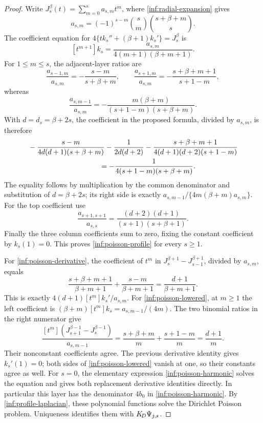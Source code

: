 \begin{proof}
Write $J_s^\beta(t)=\sum_{m=0}^s a_{s,m}t^m$, where
\eqref{inf:radial-expansion} gives
\[
 a_{s,m}=(-1)^{s-m}\binom sm\binom{s+\beta+m}s.
\]
The coefficient equation for
$4\{tk_s''+(\beta+1)k_s'\}=J_s^\beta$ is
\[
 [t^{m+1}]k_s=\frac{a_{s,m}}{4(m+1)(\beta+m+1)}.
\]
For $1\le m\le s$, the adjacent-layer ratios are
\[
 \frac{a_{s-1,m}}{a_{s,m}}=-\frac{s-m}{s+\beta+m},\qquad
 \frac{a_{s+1,m}}{a_{s,m}}=-\frac{s+\beta+m+1}{s+1-m},
\]
whereas
\[
 \frac{a_{s,m-1}}{a_{s,m}}
 =-\frac{m(\beta+m)}{(s+1-m)(s+\beta+m)}.
\]
With $d=d_s=\beta+2s$, the coefficient in the proposed formula,
divided by $a_{s,m}$, is therefore
\begin{align*}
 &-\frac{s-m}{4d(d+1)(s+\beta+m)}-\frac1{2d(d+2)}
 -\frac{s+\beta+m+1}{4(d+1)(d+2)(s+1-m)}\\
 &\hspace{35mm}=-\frac1{4(s+1-m)(s+\beta+m)}.
\end{align*}
The equality follows by multiplication by the common denominator
and substitution of $d=\beta+2s$; its right side is exactly
$a_{s,m-1}/\{4m(\beta+m)a_{s,m}\}$.
For the top coefficient use
\[
 \frac{a_{s+1,s+1}}{a_{s,s}}
 =\frac{(d+2)(d+1)}{(s+1)(s+\beta+1)}.
\]
Finally the three column coefficients sum to zero, fixing the
constant coefficient by $k_s(1)=0$. This proves
\eqref{inf:poisson-profile} for every $s\ge1$.

For \eqref{inf:poisson-derivative}, the coefficient of $t^m$ in
$J_s^{\beta+1}-J_{s-1}^{\beta+1}$, divided by $a_{s,m}$, equals
\[
 \frac{s+\beta+m+1}{\beta+m+1}
 +\frac{s-m}{\beta+m+1}
 =\frac{d+1}{\beta+m+1}.
\]
This is exactly $4(d+1)[t^m]k_s'/a_{s,m}$.
For \eqref{inf:poisson-lowered}, at $m\ge1$ the left coefficient is
$(\beta+m)[t^m]k_s=a_{s,m-1}/(4m)$.
The two binomial ratios in the right numerator give
\[
 \frac{[t^m](J_{s+1}^{\beta-1}-J_s^{\beta-1})}{a_{s,m-1}}
 =\frac{s+\beta+m}{m}+\frac{s+1-m}{m}
 =\frac{d+1}{m}.
\]
Their nonconstant coefficients agree. The previous derivative
identity gives $k_s'(1)=0$; both sides of
\eqref{inf:poisson-lowered} vanish at one, so their constants
agree as well.
For $s=0$, the elementary expression
\eqref{inf:poisson-harmonic} solves the equation and gives both
replacement derivative identities directly. In particular this
layer has the denominator $4b_0$ in \eqref{inf:poisson-harmonic}.
By \eqref{inf:profile-laplacian}, these polynomial functions solve
the Dirichlet Poisson problem. Uniqueness identifies them with
$K_{\!D}\Psi_{j,s}$.
\end{proof}

